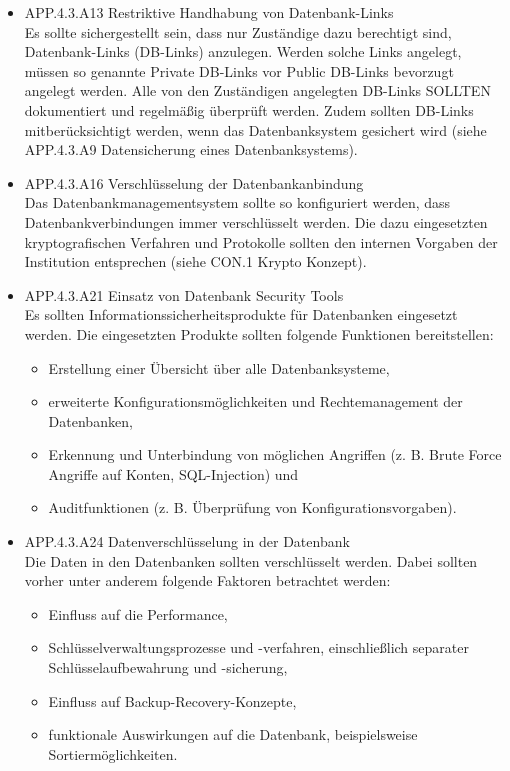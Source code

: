 \begin{itemize}
			\item  APP.4.3.A13 Restriktive Handhabung von Datenbank-Links \\
			Es sollte sichergestellt sein, dass nur Zust\"andige dazu berechtigt sind, Datenbank-Links (DB-Links) anzulegen. Werden solche Links angelegt, m\"ussen so genannte Private DB-Links vor Public DB-Links bevorzugt angelegt werden. Alle von den Zust\"andigen angelegten DB-Links SOLLTEN dokumentiert und regelm\"a{\ss}ig \"uberpr\"uft werden. Zudem sollten DB-Links mitber\"ucksichtigt werden, wenn das Datenbanksystem gesichert wird (siehe APP.4.3.A9 Datensicherung eines Datenbanksystems).\cite{Grundschutz}\\

			\item APP.4.3.A16 Verschl\"usselung der Datenbankanbindung \\
			Das Datenbankmanagementsystem sollte so konfiguriert werden, dass Datenbankverbindungen immer verschl\"usselt werden. Die dazu eingesetzten kryptografischen Verfahren und Protokolle sollten den internen Vorgaben der Institution entsprechen (siehe CON.1 Krypto Konzept).\cite{Grundschutz}\\
			
			\item APP.4.3.A21 Einsatz von Datenbank Security Tools\\
			Es sollten Informationssicherheitsprodukte f\"ur Datenbanken eingesetzt werden. Die eingesetzten Produkte sollten folgende Funktionen bereitstellen:
\begin{itemize}
	\item Erstellung einer \"Ubersicht \"uber alle Datenbanksysteme,
	\item erweiterte Konfigurationsm\"oglichkeiten und Rechtemanagement der Datenbanken,
	\item Erkennung und Unterbindung von m\"oglichen Angriffen (z. B. Brute Force Angriffe auf Konten, SQL-Injection) und
	\item Auditfunktionen (z. B. \"Uberpr\"ufung von Konfigurationsvorgaben).\cite{Grundschutz}\\
\end{itemize}
			
			\item APP.4.3.A24 Datenverschl\"usselung in der Datenbank\\
			Die Daten in den Datenbanken sollten verschl\"usselt werden. Dabei sollten vorher unter anderem folgende Faktoren betrachtet werden:
\begin{itemize}
	\item Einfluss auf die Performance,
	\item Schl\"usselverwaltungsprozesse und -verfahren, einschlie{\ss}lich separater Schl\"usselaufbewahrung und -sicherung,
	\item Einfluss auf Backup-Recovery-Konzepte,
	\item funktionale Auswirkungen auf die Datenbank, beispielsweise Sortierm\"oglichkeiten.\cite{Grundschutz}\\
\end{itemize}
\end{itemize}


